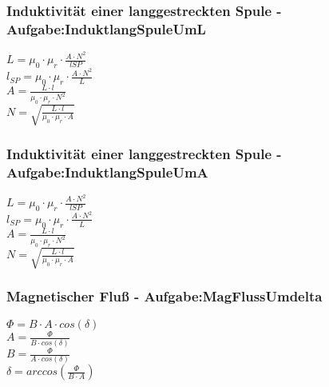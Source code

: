 \subsubsection{Induktivität einer langgestreckten Spule - Aufgabe:InduktlangSpuleUmL} 
\begin{minipage}{0.45\textwidth} 
$ L = \mu _{0} \cdot \mu _{r} \cdot \frac{A\cdot N^{2} }{lSP} $\\ 
$ l_{SP} = \mu _{0} \cdot \mu _{r} \cdot \frac{A\cdot N^{2} }{L} $\\ 
$ A = \frac{ L\cdot l}{\mu _{0} \cdot \mu _{r} \cdot N^{2} } $\\ 
$ N = \sqrt{\frac{ L\cdot l}{\mu _{0} \cdot \mu _{r} \cdot A}} $\\ 
\end{minipage} 
\begin{minipage}{0.45\textwidth} 
 
\end{minipage} 
\subsubsection{Induktivität einer langgestreckten Spule - Aufgabe:InduktlangSpuleUmA} 
\begin{minipage}{0.45\textwidth} 
$ L = \mu _{0} \cdot \mu _{r} \cdot \frac{A\cdot N^{2} }{lSP} $\\ 
$ l_{SP} = \mu _{0} \cdot \mu _{r} \cdot \frac{A\cdot N^{2} }{L} $\\ 
$ A = \frac{ L\cdot l}{\mu _{0} \cdot \mu _{r} \cdot N^{2} } $\\ 
$ N = \sqrt{\frac{ L\cdot l}{\mu _{0} \cdot \mu _{r} \cdot A}} $\\ 
\end{minipage} 
\begin{minipage}{0.45\textwidth} 
 
\end{minipage} 
\subsubsection{Magnetischer Fluß - Aufgabe:MagFlussUmdelta} 
\begin{minipage}{0.45\textwidth} 
$ \Phi  = B\cdot A\cdot cos(\delta ) $\\ 
$ A = \frac{ \Phi }{B\cdot cos(\delta )} $\\ 
$ B = \frac{ \Phi }{A\cdot cos(\delta )} $\\ 
$ \delta =arccos(\frac{ \Phi }{B\cdot A}) $\\ 
\end{minipage} 
\begin{minipage}{0.45\textwidth} 
 
\end{minipage} 
